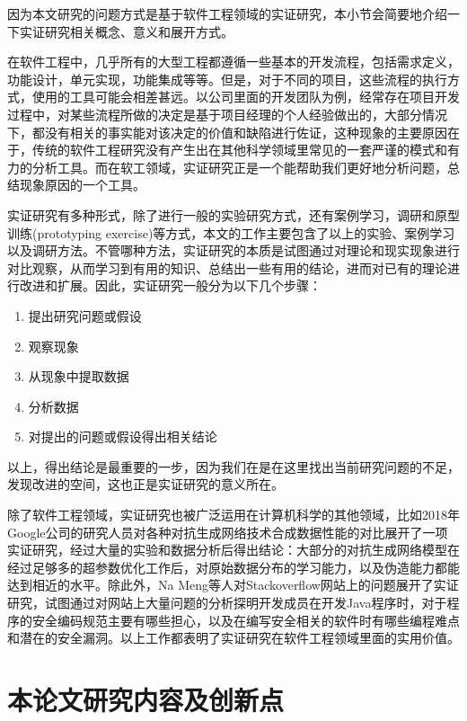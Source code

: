 
因为本文研究的问题方式是基于软件工程领域的实证研究，本小节会简要地介绍一下实证研究相关概念、意义和展开方式。

在软件工程中，几乎所有的大型工程都遵循一些基本的开发流程，包括需求定义，功能设计，单元实现，功能集成等等。但是，对于不同的项目，这些流程的执行方式，使用的工具可能会相差甚远。以公司里面的开发团队为例，经常存在项目开发过程中，对某些流程所做的决定是基于项目经理的个人经验做出的，大部分情况下，都没有相关的事实能对该决定的价值和缺陷进行佐证，这种现象的主要原因在于，传统的软件工程研究没有产生出在其他科学领域里常见的一套严谨的模式和有力的分析工具。而在软工领域，实证研究正是一个能帮助我们更好地分析问题，总结现象原因的一个工具。

实证研究有多种形式，除了进行一般的实验研究方式，还有案例学习，调研和原型训练(prototyping exercise)等方式，本文的工作主要包含了以上的实验、案例学习以及调研方法。不管哪种方法，实证研究的本质是试图通过对理论和现实现象进行对比观察，从而学习到有用的知识、总结出一些有用的结论，进而对已有的理论进行改进和扩展。因此，实证研究一般分为以下几个步骤：
\begin{enumerate}
    \item 提出研究问题或假设
    \item 观察现象
    \item 从现象中提取数据
    \item 分析数据
    \item 对提出的问题或假设得出相关结论
\end{enumerate}
以上，得出结论是最重要的一步，因为我们在是在这里找出当前研究问题的不足，发现改进的空间，这也正是实证研究的意义所在。

除了软件工程领域，实证研究也被广泛运用在计算机科学的其他领域，比如2018年Google公司的研究人员对各种对抗生成网络技术合成数据性能的对比展开了一项实证研究\cite{gans-equal}，经过大量的实验和数据分析后得出结论：大部分的对抗生成网络模型在经过足够多的超参数优化工作后，对原始数据分布的学习能力，以及伪造能力都能达到相近的水平。除此外，Na Meng\cite{icse-vote}等人对Stackoverflow网站上的问题展开了实证研究，试图通过对网站上大量问题的分析探明开发成员在开发Java程序时，对于程序的安全编码规范主要有哪些担心，以及在编写安全相关的软件时有哪些编程难点和潜在的安全漏洞。以上工作都表明了实证研究在软件工程领域里面的实用价值。 

\section{本论文研究内容及创新点}

